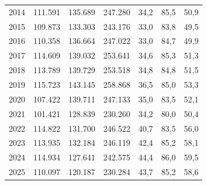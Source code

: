 \begin{apendicesenv}
\begin{landscape}
{\begin{longtable}{@{}rrrrrrr@{}}
2014 & 111.591 & 135.689 & 247.280 & 34,2 & 85,5 & 50,9 \\
2015 & 109.873 & 133.303 & 243.176 & 33,0 & 83,8 & 49,5 \\
2016 & 110.358 & 136.664 & 247.022 & 33,0 & 84,7 & 49,9 \\
2017 & 114.609 & 139.032 & 253.641 & 34,6 & 85,3 & 51,3 \\
2018 & 113.789 & 139.729 & 253.518 & 34,8 & 84,8 & 51,5 \\
2019 & 115.723 & 143.145 & 258.868 & 36,5 & 85,0 & 53,3 \\
2020 & 107.422 & 139.711 & 247.133 & 35,0 & 83,5 & 52,1 \\
2021 & 101.421 & 128.839 & 230.260 & 34,2 & 80,0 & 50,4 \\
2022 & 114.822 & 131.700 & 246.522 & 40,7 & 83,5 & 56,0 \\
2023 & 113.935 & 132.184 & 246.119 & 42,4 & 85,2 & 58,1 \\
2024 & 114.934 & 127.641 & 242.575 & 44,4 & 86,0 & 59,5 \\
2025 & 110.097 & 120.187 & 230.284 & 43,7 & 85,2 & 58,6 \\
\end{longtable}}
\vspace{-6pt}
\end{landscape}



\end{apendicesenv}
